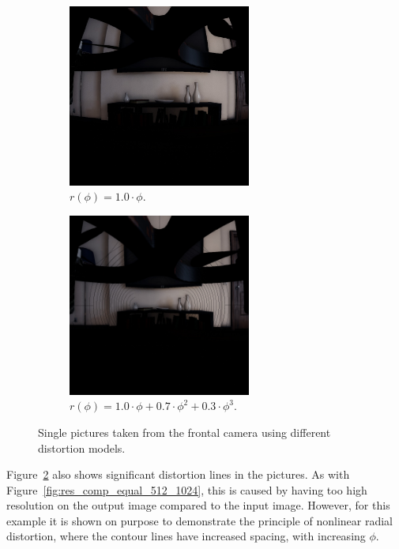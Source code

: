 \begin{figure}[!htb]
    \centering
    \begin{subfigure}{0.45\textwidth}
        \centering
        \includegraphics[height=6cm]{rapport/fig/Results/single/single_equi_distort_noline.jpeg}
        \caption{$r(\phi) = 1.0 \cdot \phi$.}
        \label{fig:res_different_distortion_k1}
    \end{subfigure}
    \begin{subfigure}{0.45\textwidth}
        \centering
        \includegraphics[height=6cm]{rapport/fig/Results/single/single_k2_distort.jpeg}
        \caption{$r(\phi) = 1.0 \cdot \phi + 0.7 \cdot \phi^2 + 0.3 \cdot \phi^3$.}
        \label{fig:res_different_distortion_k1k2k3}
    \end{subfigure}
    \caption{Single pictures taken from the frontal camera using different distortion models.}
    \label{fig:res_different_distortions}
\end{figure}

Figure~\ref{fig:res_different_distortion_k1k2k3} also shows significant distortion lines in the pictures. As with Figure~\ref{fig:res_comp_equal_512_1024}, this is caused by having too high resolution on the output image compared to the input image. However, for this example it is shown on purpose to demonstrate the principle of nonlinear radial distortion, where the contour lines have increased spacing, with increasing $\phi$.


